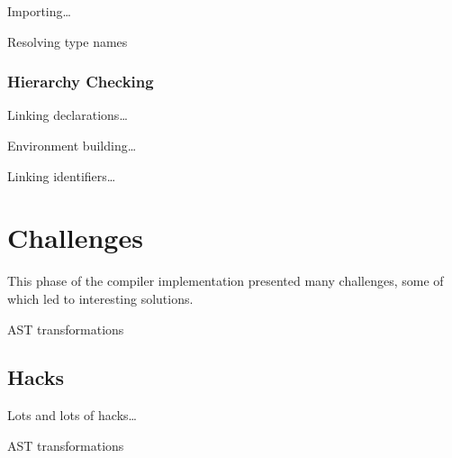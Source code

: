 \documentclass[pdftex,11pt,a4paper]{article}
\begin{document}
Importing\ldots

Resolving type names




\subsubsection{Hierarchy Checking}

Linking declarations\ldots

Environment building\ldots


Linking identifiers\ldots



\section{Challenges}

This phase of the compiler implementation presented many
challenges, some of which led to interesting solutions.

AST transformations


\subsection{Hacks}

Lots and lots of hacks\ldots

AST transformations
\end{document}

